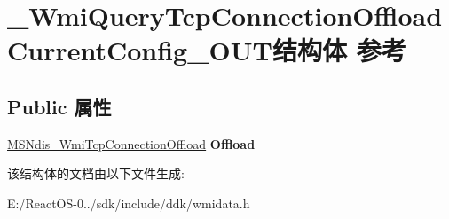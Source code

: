 \hypertarget{struct___wmi_query_tcp_connection_offload_current_config___o_u_t}{}\section{\+\_\+\+Wmi\+Query\+Tcp\+Connection\+Offload\+Current\+Config\+\_\+\+O\+U\+T结构体 参考}
\label{struct___wmi_query_tcp_connection_offload_current_config___o_u_t}
\subsection*{Public 属性}
\begin{DoxyCompactItemize}
\item 
\mbox{\label{struct___wmi_query_tcp_connection_offload_current_config___o_u_t_a66fc6a7bd9a47b7bece4055b30522712}} 
\hyperlink{struct___m_s_ndis___wmi_tcp_connection_offload}{M\+S\+Ndis\+\_\+\+Wmi\+Tcp\+Connection\+Offload} {\bfseries Offload}
\end{DoxyCompactItemize}


该结构体的文档由以下文件生成\+:\begin{DoxyCompactItemize}
\item 
E\+:/\+React\+O\+S-\/0../sdk/include/ddk/wmidata.\+h\end{DoxyCompactItemize}
